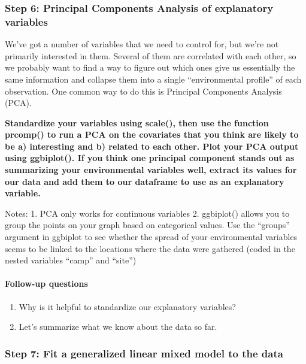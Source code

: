 \documentclass[]{article}
\providecommand{\tightlist}{%
  \setlength{\itemsep}{0pt}\setlength{\parskip}{0pt}}
\let\oldparagraph\paragraph
\renewcommand{\paragraph}[1]{\oldparagraph{#1}\mbox{}}
\begin{document}
\hypertarget{step-6-principal-components-analysis-of-explanatory-variables}{%
\subsubsection{Step 6: Principal Components Analysis of explanatory
variables}\label{step-6-principal-components-analysis-of-explanatory-variables}}

We've got a number of variables that we need to control for, but we're
not primarily interested in them. Several of them are correlated with
each other, so we probably want to find a way to figure out which ones
give us essentially the same information and collapse them into a single
``environmental profile'' of each observation. One common way to do this
is Principal Components Analysis (PCA).

\textbf{Standardize your variables using scale(), then use the function
prcomp() to run a PCA on the covariates that you think are likely to be
a) interesting and b) related to each other. Plot your PCA output using
ggbiplot(). If you think one principal component stands out as
summarizing your environmental variables well, extract its values for
our data and add them to our dataframe to use as an explanatory
variable.}

Notes: 1. PCA only works for continuous variables 2. ggbiplot() allows
you to group the points on your graph based on categorical values. Use
the ``groups'' argument in ggbiplot to see whether the spread of your
environmental variables seems to be linked to the locations where the
data were gathered (coded in the nested variables ``camp'' and ``site'')

\hypertarget{follow-up-questions-2}{%
\paragraph{Follow-up questions}\label{follow-up-questions-2}}

\begin{enumerate}
\def\labelenumi{\arabic{enumi}.}
\tightlist
\item
  Why is it helpful to standardize our explanatory variables?
\item
  Let's summarize what we know about the data so far.
\end{enumerate}

\hypertarget{step-7-fit-a-generalized-linear-mixed-model-to-the-data}{%
\subsubsection{Step 7: Fit a generalized linear mixed model to the
data}\label{step-7-fit-a-generalized-linear-mixed-model-to-the-data}}
\end{document}
